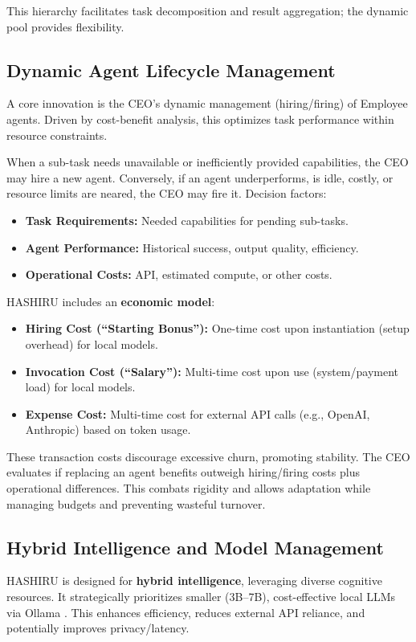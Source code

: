 \documentclass[conference]{IEEEtran}
\begin{document}
This hierarchy facilitates task decomposition and result aggregation; the dynamic pool provides flexibility.

\subsection{Dynamic Agent Lifecycle Management}
\label{subsec:dynamic_mgmt}
A core innovation is the CEO's dynamic management (hiring/firing) of Employee agents. Driven by cost-benefit analysis, this optimizes task performance within resource constraints.

When a sub-task needs unavailable or inefficiently provided capabilities, the CEO may hire a new agent. Conversely, if an agent underperforms, is idle, costly, or resource limits are neared, the CEO may fire it. Decision factors:
\begin{itemize}
    \item \textbf{Task Requirements:} Needed capabilities for pending sub-tasks.
    \item \textbf{Agent Performance:} Historical success, output quality, efficiency.
    \item \textbf{Operational Costs:} API, estimated compute, or other costs.
\end{itemize}

HASHIRU includes an \textbf{economic model}:
\begin{itemize}
    \item \textbf{Hiring Cost (``Starting Bonus''):} One-time cost upon instantiation (setup overhead) for local models.
    \item \textbf{Invocation Cost (``Salary''):} Multi-time cost upon use (system/payment load) for local models.
    \item \textbf{Expense Cost:} Multi-time cost for external API calls (e.g., OpenAI, Anthropic) based on token usage.
\end{itemize}
These transaction costs discourage excessive churn, promoting stability. The CEO evaluates if replacing an agent benefits outweigh hiring/firing costs plus operational differences. This combats rigidity and allows adaptation while managing budgets and preventing wasteful turnover.

\subsection{Hybrid Intelligence and Model Management}
HASHIRU is designed for \textbf{hybrid intelligence}, leveraging diverse cognitive resources. It strategically prioritizes smaller (3B--7B), cost-effective local LLMs via Ollama \cite{ollama}. This enhances efficiency, reduces external API reliance, and potentially improves privacy/latency.
\end{document}
